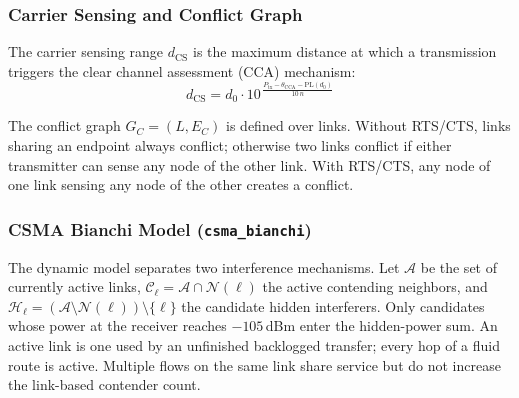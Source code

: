 \documentclass[conference]{IEEEtran}
\begin{document}
\subsubsection{Carrier Sensing and Conflict Graph}

The carrier sensing range $d_\text{CS}$ is the maximum distance at which a
transmission triggers the clear channel assessment (CCA) mechanism:
\begin{equation}
d_\text{CS} = d_0 \cdot 10^{\,\frac{P_\text{tx} - \theta_\text{CCA} - \text{PL}(d_0)}{10\,n}}
\label{eq:csrange}
\end{equation}

The conflict graph $G_C = (L, E_C)$ is defined over links.  Without RTS/CTS,
links sharing an endpoint always conflict; otherwise two links conflict
if either transmitter can sense any node of the other link.  With RTS/CTS, any node of one link sensing any node of the other
creates a conflict.

\subsubsection{CSMA Bianchi Model (\texttt{csma\_bianchi})}
\label{sec:bianchi}

The dynamic model separates two interference mechanisms.  Let $\mathcal{A}$
be the set of currently active links, $\mathcal{C}_\ell = \mathcal{A} \cap
\mathcal{N}(\ell)$ the active contending neighbors, and $\mathcal{H}_\ell =
(\mathcal{A} \setminus \mathcal{N}(\ell)) \setminus \{\ell\}$ the candidate
hidden interferers. Only candidates whose power at the receiver reaches
$-105$\,dBm enter the hidden-power sum. An active link is one used by an
unfinished backlogged transfer; every hop of a fluid route is active.
Multiple flows on the same link share service but do not increase the
link-based contender count.
\end{document}
